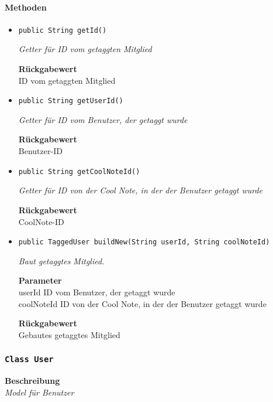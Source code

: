     \paragraph*{Methoden}
    \begin{itemize}
    	\item{\texttt{public String getId()}}
    	
    	\textit{Getter für ID vom getaggten Mitglied}
    	
    	
    	
    	\textbf{Rückgabewert} \\
    	ID vom getaggten Mitglied        \item{\texttt{public String getUserId()}}
    	
    	\textit{Getter für ID vom Benutzer, der getaggt wurde}
    	
    	
    	
    	\textbf{Rückgabewert} \\
    	Benutzer-ID        \item{\texttt{public String getCoolNoteId()}}
    	
    	\textit{Getter für ID von der Cool Note, in der der Benutzer getaggt wurde}
    	
    	
    	
    	\textbf{Rückgabewert} \\
    	CoolNote-ID        \item{\texttt{public TaggedUser buildNew(String userId, String coolNoteId)}}
    	
    	\textit{Baut getaggtes Mitglied.}
    	
    	\textbf{Parameter} \\
    	userId ID vom Benutzer, der getaggt wurde\\
    	coolNoteId ID von der Cool Note, in der der Benutzer getaggt wurde
    	
    	\textbf{Rückgabewert} \\
    	Gebautes getaggtes Mitglied
    \end{itemize}
    \subsubsection{\texttt{Class User}}
    \textbf{Beschreibung} \\
    \textit{Model für Benutzer}
